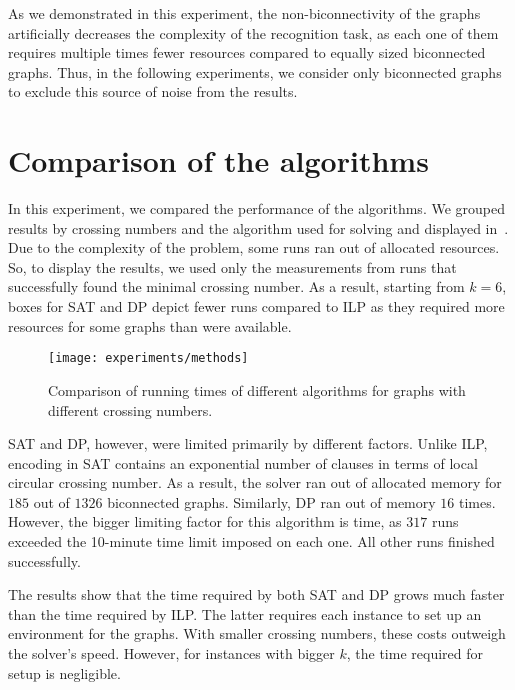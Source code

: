 As we demonstrated in this experiment, the non-biconnectivity of the graphs artificially decreases the complexity of the recognition task, as each one of them requires multiple times fewer resources compared to equally sized biconnected graphs. Thus, in the following experiments, we consider only biconnected graphs to exclude this source of noise from the results.


\section{Comparison of the algorithms}

In this experiment, we compared the performance of the algorithms. We grouped results by crossing numbers and the algorithm used for solving and displayed in~. Due to the complexity of the problem, some runs ran out of allocated resources. So, to display the results, we used only the measurements from runs that successfully found the minimal crossing number. As a result, starting from \(k = 6\), boxes for \textsf{SAT} and \textsf{DP} depict fewer runs compared to \textsf{ILP} as they required more resources for some graphs than were available.

\begin{figure}[tbh]
    \centering
    \texttt{[image: experiments/methods]}
    \caption{Comparison of running times of different algorithms for graphs with different crossing numbers.}
    \label{fig:methods}
\end{figure}

\textsf{SAT} and \textsf{DP}, however, were limited primarily by different factors. Unlike \textsf{ILP}, encoding in \textsf{SAT} contains an exponential number of clauses in terms of local circular crossing number. As a result, the solver ran out of allocated memory for \(185\) out of \(1326\) biconnected graphs. Similarly, \textsf{DP} ran out of memory \(16\) times. However, the bigger limiting factor for this algorithm is time, as \(317\) runs exceeded the 10-minute time limit imposed on each one. All other runs finished successfully.

The results show that the time required by both \textsf{SAT} and \textsf{DP} grows much faster than the time required by \textsf{ILP}. The latter requires each instance to set up an environment for the graphs. With smaller crossing numbers, these costs outweigh the solver's speed. However, for instances with bigger \(k\), the time required for setup is negligible.

